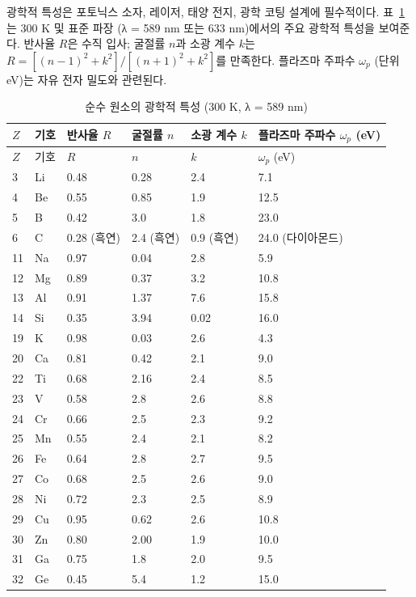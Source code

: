 \documentclass[12pt,a4paper]{article}
\begin{document}
	광학적 특성은 포토닉스 소자, 레이저, 태양 전지, 광학 코팅 설계에 필수적이다. 표~\ref{tab:optical-properties-func}는 300 K 및 표준 파장 (λ = 589 nm 또는 633 nm)에서의 주요 광학적 특성을 보여준다. 반사율 \(R\)은 수직 입사; 굴절률 \(n\)과 소광 계수 \(k\)는 \(R = [(n-1)^2 + k^2]/[(n+1)^2 + k^2]\)를 만족한다. 플라즈마 주파수 \(\omega_p\) (단위 eV)는 자유 전자 밀도와 관련된다.
	
	\begin{longtable}{p{0.8cm}p{1.2cm}p{2.2cm}p{2.2cm}p{2.2cm}p{2.2cm}}
		\caption{순수 원소의 광학적 특성 (300 K, λ = 589 nm)} \label{tab:optical-properties-func} \\
		\toprule
		\(Z\) & 기호 & 반사율 \(R\) & 굴절률 \(n\) & 소광 계수 \(k\) & 플라즈마 주파수 \(\omega_p\) (eV) \\
		\midrule
		\endfirsthead
		\toprule
		\(Z\) & 기호 & \(R\) & \(n\) & \(k\) & \(\omega_p\) (eV) \\
		\midrule
		\endhead
		3  & Li & 0.48 & 0.28 & 2.4 & 7.1 \\
		4  & Be & 0.55 & 0.85 & 1.9 & 12.5 \\
		5  & B  & 0.42 & 3.0 & 1.8 & 23.0 \\
		6  & C  & 0.28 (흑연) & 2.4 (흑연) & 0.9 (흑연) & 24.0 (다이아몬드) \\
		11 & Na & 0.97 & 0.04 & 2.8 & 5.9 \\
		12 & Mg & 0.89 & 0.37 & 3.2 & 10.8 \\
		13 & Al & 0.91 & 1.37 & 7.6 & 15.8 \\
		14 & Si & 0.35 & 3.94 & 0.02 & 16.0 \\
		19 & K  & 0.98 & 0.03 & 2.6 & 4.3 \\
		20 & Ca & 0.81 & 0.42 & 2.1 & 9.0 \\
		22 & Ti & 0.68 & 2.16 & 2.4 & 8.5 \\
		23 & V  & 0.58 & 2.8 & 2.6 & 8.8 \\
		24 & Cr & 0.66 & 2.5 & 2.3 & 9.2 \\
		25 & Mn & 0.55 & 2.4 & 2.1 & 8.2 \\
		26 & Fe & 0.64 & 2.8 & 2.7 & 9.5 \\
		27 & Co & 0.68 & 2.5 & 2.6 & 9.0 \\
		28 & Ni & 0.72 & 2.3 & 2.5 & 8.9 \\
		29 & Cu & 0.95 & 0.62 & 2.6 & 10.8 \\
		30 & Zn & 0.80 & 2.00 & 1.9 & 10.0 \\
		31 & Ga & 0.75 & 1.8 & 2.0 & 9.5 \\
		32 & Ge & 0.45 & 5.4 & 1.2 & 15.0 \\

\end{longtable}
\end{document}
